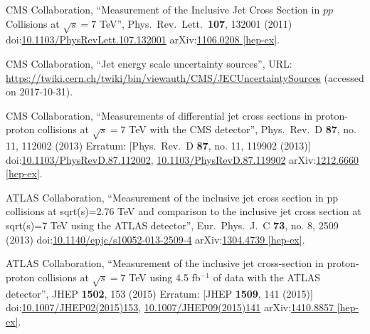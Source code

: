 \begin{thebibliography}{99}
CMS Collaboration, ``Measurement of the Inclusive Jet Cross Section in $pp$ Collisions at $\sqrt{s}=7$ TeV'', Phys.\ Rev.\ Lett.\ {\bf 107}, 132001 (2011) doi:\href{https://doi.org/10.1103/PhysRevLett.107.132001}{10.1103/PhysRevLett.107.132001} arXiv:\href{https://arxiv.org/abs/1106.0208}{1106.0208 [hep-ex]}.

CMS Collaboration, ``Jet energy scale uncertainty sources'', URL: \url{https://twiki.cern.ch/twiki/bin/viewauth/CMS/JECUncertaintySources} (accessed on 2017-10-31).

CMS Collaboration, ``Measurements of differential jet cross sections in proton-proton collisions at $\sqrt{s}=7$ TeV with the CMS detector'', Phys.\ Rev.\ D {\bf 87}, no. 11, 112002 (2013) Erratum: [Phys.\ Rev.\ D {\bf 87}, no. 11, 119902 (2013)] doi:\href{http://dx.doi.org/10.1103/PhysRevD.87.112002}{10.1103/PhysRevD.87.112002}, \href{http://dx.doi.org/10.1103/PhysRevD.87.119902}{10.1103/PhysRevD.87.119902} arXiv:\href{https://arxiv.org/abs/1212.6660}{1212.6660 [hep-ex]}.




ATLAS Collaboration, ``Measurement of the inclusive jet cross section in pp collisions at sqrt(s)=2.76 TeV and comparison to the inclusive jet cross section at sqrt(s)=7 TeV using the ATLAS detector'', Eur.\ Phys.\ J.\ C {\bf 73}, no. 8, 2509 (2013) doi:\href{http://dx.doi.org/10.1140/epjc/s10052-013-2509-4}{10.1140/epjc/s10052-013-2509-4} arXiv:\href{https://arxiv.org/abs/1304.4739}{1304.4739 [hep-ex]}.
 
ATLAS Collaboration, ``Measurement of the inclusive jet cross-section in proton-proton collisions at $ \sqrt{s}=7 $ TeV using 4.5 fb$^{-1}$ of data with the ATLAS detector'', JHEP {\bf 1502}, 153 (2015) Erratum: [JHEP {\bf 1509}, 141 (2015)] doi:\href{http://dx.doi.org/10.1007/JHEP02(2015)153}{10.1007/JHEP02(2015)153}, \href{http://dx.doi.org/10.1007/JHEP09(2015)141}{10.1007/JHEP09(2015)141} arXiv:\href{https://arxiv.org/abs/1410.8857}{1410.8857 [hep-ex]}.


\end{thebibliography}
